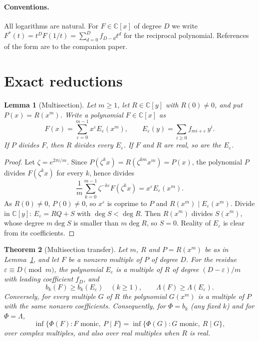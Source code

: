 \documentclass[11pt]{article}
\newtheorem{theorem}{Theorem}[section]
\newtheorem{lemma}[theorem]{Lemma}
\begin{document}
\paragraph{Conventions.}
All logarithms are natural.  For $F\in\mathbb C[x]$ of degree $D$ we write
$F^*(t)=t^DF(1/t)=\sum_{d=0}^Df_{D-d}t^d$ for the reciprocal polynomial.
References of the form \cite[Theorem~3.2]{coefficient-mass} are to the
companion paper.

\section{Exact reductions}\label{sec:exact}

\begin{lemma}[Multisection]\label{lem:multisection}
Let $m\ge1$, let $R\in\mathbb C[y]$ with $R(0)\ne0$, and put $P(x)=R(x^m)$.  Write
a polynomial $F\in\mathbb C[x]$ as
\[
  F(x)=\sum_{\varepsilon=0}^{m-1}x^\varepsilon E_\varepsilon(x^m),
  \qquad E_\varepsilon(y)=\sum_{i\ge0}f_{mi+\varepsilon}\,y^i .
\]
If $P$ divides $F$, then $R$ divides every $E_\varepsilon$.  If $F$ and $R$
are real, so are the $E_\varepsilon$.
\end{lemma}

\begin{proof}
Let $\zeta=e^{2\pi i/m}$.  Since $P(\zeta^kx)=R(\zeta^{km}x^m)=P(x)$, the
polynomial $P$ divides $F(\zeta^kx)$ for every $k$, hence divides
\[
  \frac1m\sum_{k=0}^{m-1}\zeta^{-k\varepsilon}F(\zeta^kx)
  =x^\varepsilon E_\varepsilon(x^m).
\]
As $R(0)\ne0$, $P(0)\ne0$, so $x^\varepsilon$ is coprime to $P$ and
$R(x^m)\mid E_\varepsilon(x^m)$.  Divide in $\mathbb C[y]$:
$E_\varepsilon=RQ+S$ with $\deg S<\deg R$.  Then $R(x^m)$ divides
$S(x^m)$, whose degree $m\deg S$ is smaller than $m\deg R$, so $S=0$.
Reality of $E_\varepsilon$ is clear from its coefficients.
\end{proof}

\begin{theorem}[Multisection transfer]\label{thm:transfer}
Let $m$, $R$ and $P=R(x^m)$ be as in Lemma~\ref{lem:multisection}, and let
$F$ be a nonzero multiple of $P$ of degree $D$.  For the residue
$\varepsilon\equiv D\pmod m$, the polynomial $E_\varepsilon$ is a multiple of
$R$ of degree $(D-\varepsilon)/m$ with leading coefficient $f_D$, and
\[
  b_k(F)\ge b_k(E_\varepsilon)\quad(k\ge1),\qquad
  \Lambda(F)\ge\Lambda(E_\varepsilon).
\]
Conversely, for every multiple $G$ of $R$ the polynomial $G(x^m)$ is a
multiple of $P$ with the same nonzero coefficients.  Consequently, for
$\Phi=b_k$ (any fixed $k$) and for $\Phi=\Lambda$,
\[
  \inf\{\Phi(F):F\text{ monic},\ P\mid F\}
  =\inf\{\Phi(G):G\text{ monic},\ R\mid G\},
\]
over complex multiples, and also over real multiples when $R$ is real.
\end{theorem}
\end{document}
